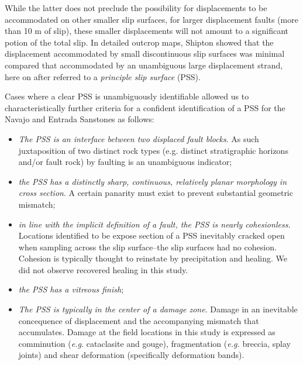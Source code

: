 \documentclass[12pt,a4paper]{article}
\begin{document}
While the latter does not preclude the possibility for displacements to be accommodated on other smaller slip surfaces, for larger displacement faults (more than 10 m of slip), these smaller displacements will not amount to a significant potion of the total slip. In detailed outcrop maps, Shipton showed that the displacement accommodated by small discontinuous slip surfaces was minimal compared that accommodated by an unambiguous large displacement strand, here on after referred to a \textit{principle slip surface} (PSS). 

Cases where a clear PSS is unambiguously identifiable allowed us to characteristically further criteria for a confident identification of a PSS for the Navajo and Entrada Sanstones as follows:

\begin{itemize}

	\item \textit{The PSS is an interface between two displaced fault blocks}. As such juxtaposition of two distinct rock types (e.g. distinct stratigraphic horizons and/or fault rock) by faulting is an unambiguous indicator;
	
	\item \textit{the PSS has a distinctly sharp, continuous, relatively planar morphology in cross section}. A certain panarity must exist to prevent substantial geometric mismatch;
	
	\item \textit{in line with the implicit definition of a fault, the PSS is nearly cohesionless.} Locations identified to be expose section of a PSS inevitably cracked open when sampling across the slip surface--the slip surfaces had no cohesion. Cohesion is typically thought to reinstate by precipitation and healing. We did not observe recovered healing in this study.
	
	\item \textit{the PSS has a vitreous finish};
	
	\item \textit{The PSS is typically in the center of a damage zone}. Damage in an inevitable concequence of displacement and the accompanying mismatch that accumulates. Damage at the field locations in this study is expressed as comminution (\textit{e.g.} cataclasite and gouge), fragmentation (\textit{e.g.} breccia, splay joints) and shear deformation (specifically deformation bands).
	
\end{itemize}
\end{document}
